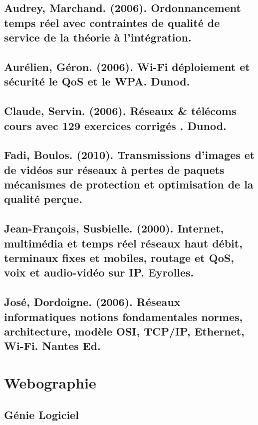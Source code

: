 \documentclass[french]{article}
\begin{document}

\subsection*{Audrey, Marchand. (2006). Ordonnancement temps réel avec contraintes de qualité de service de la théorie à l'intégration.}

\subsection*{Aurélien, Géron. (2006). Wi-Fi déploiement et sécurité le QoS et le WPA. Dunod.}

\subsection*{Claude, Servin. (2006). Réseaux \& télécoms cours avec 129 exercices corrigés . Dunod.}

\subsection*{Fadi, Boulos. (2010). Transmissions d'images et de vidéos sur réseaux à pertes de paquets mécanismes de protection et optimisation de la qualité perçue.}

\subsection*{Jean-François, Susbielle. (2000). Internet, multimédia et temps réel réseaux haut débit, terminaux fixes et mobiles, routage et QoS, voix et audio-vidéo sur IP. Eyrolles.}

\subsection*{José, Dordoigne. (2006). Réseaux informatiques notions fondamentales normes, architecture, modèle OSI, TCP/IP, Ethernet, Wi-Fi. Nantes Ed.}

\newpage

\section{Webographie}

\subsection{Génie Logiciel}
\end{document}
